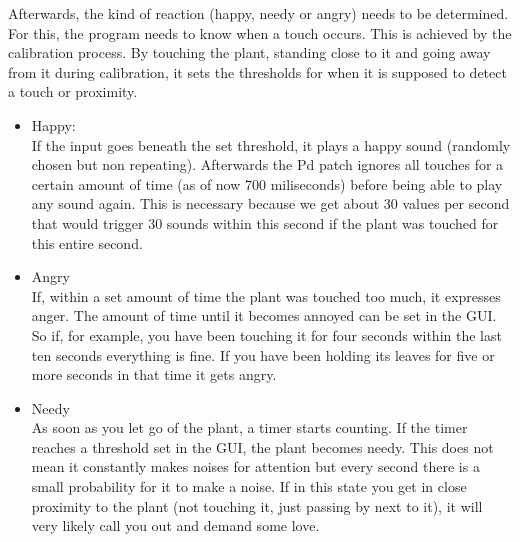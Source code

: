 Afterwards, the kind of reaction (happy, needy or angry) needs to be determined. For this, the program needs to know when a touch occurs. This is achieved by the calibration process. By touching the plant, standing close to it and going away from it during calibration, it sets the thresholds for when it is supposed to detect a touch or proximity.
\begin{itemize}
\item Happy:\\
If the input goes beneath the set threshold, it plays a happy sound (randomly chosen but non repeating). Afterwards the Pd patch ignores all touches for a certain amount of time (as of now 700 miliseconds) before being able to play any sound again. This is necessary because we get about 30 values per second that would trigger 30 sounds within this second if the plant was touched for this entire second.
\item Angry\\
If, within a set amount of time the plant was touched too much, it expresses anger. The amount of time until it becomes annoyed can be set in the GUI. So if, for example, you have been touching it for four seconds within the last ten seconds everything is fine. If you have been holding its leaves for five or more seconds in that time it gets angry.
\item Needy\\
As soon as you let go of the plant, a timer starts counting. If the timer reaches a threshold set in the GUI, the plant becomes needy. This does not mean it constantly makes noises for attention but every second there is a small probability for it to make a noise. If in this state you get in close proximity to the plant (not touching it, just passing by next to it), it will very likely call you out and demand some love.
\end{itemize}

